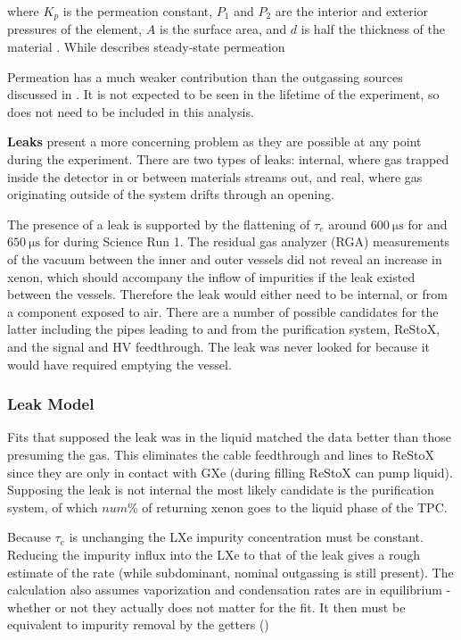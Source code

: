 \noindent where $K_p$ is the permeation constant, $P_1$ and $P_2$ are the interior and exterior pressures of the element, $A$ is the
surface area, and
$d$ is half the thickness of the material .  While 
describes steady-state permeation 

Permeation has a much weaker contribution than the outgassing sources discussed in
.  It is not expected to be seen in the lifetime of the
experiment, so does not need to be included in this analysis.

\textbf{Leaks} present a more concerning problem as they are possible at any point during the experiment.  There are two types of leaks:
internal, where gas trapped inside the detector
in or between materials streams out, and real, where gas originating outside of the system drifts through an opening.

The presence of a leak is supported by the flattening of $\tau_e$ around $600\ \mathrm{\mu s}$ for \alphadecays and
$650\ \mathrm{\mu s}$ for \metakr during Science Run 1.  The residual gas analyzer (RGA) measurements of the vacuum between the inner and
outer vessels did not reveal an increase in xenon, which should accompany the inflow of impurities if the leak existed
between the vessels.  Therefore the
leak would either need to be internal, or from a component exposed to air.  There are a number of possible candidates for the
latter including the pipes leading to and from the purification system, ReStoX, and the signal and HV feedthrough.  The leak was never
looked for because it would have required emptying the vessel.



\subsubsection{Leak Model}
\label{subsubsec:electron_lifetime_model_outgassing_leak_model}
Fits that supposed the leak was in the liquid matched the data better than those presuming the gas.  This eliminates the cable feedthrough
and lines to ReStoX since they are only in contact with GXe (during filling ReStoX can pump liquid).  Supposing the leak is
not internal the most likely candidate is the purification system, of which $num\%$ of returning xenon goes to the liquid phase of the
TPC.

Because $\tau_e$ is unchanging the LXe impurity concentration must be constant.  Reducing the impurity influx into the LXe to that of the
leak
gives a rough estimate of the rate (while subdominant, nominal outgassing is still present).  The calculation also
assumes vaporization and condensation rates are in equilibrium - whether or not they actually does not matter for the fit.  It then must
be equivalent to impurity removal by the getters ()

